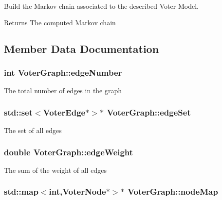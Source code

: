 Build the Markov chain associated to the described Voter Model. 

\begin{DoxyReturn}{Returns}
The computed Markov chain 
\end{DoxyReturn}


\subsection{Member Data Documentation}
\hypertarget{class_voter_graph_a6840594abf9c606b4ac8c7cac88cdf9b}{
\subsubsection[{edge\-Number}]{\setlength{\rightskip}{0pt plus 5cm}int Voter\-Graph\-::edge\-Number}}\label{class_voter_graph_a6840594abf9c606b4ac8c7cac88cdf9b}
The total number of edges in the graph \hypertarget{class_voter_graph_a712b0ec4b780579721b7b6bca8fd409e}{
\subsubsection[{edge\-Set}]{\setlength{\rightskip}{0pt plus 5cm}std\-::set$<${\bf Voter\-Edge}$\ast$$>$$\ast$ Voter\-Graph\-::edge\-Set}}\label{class_voter_graph_a712b0ec4b780579721b7b6bca8fd409e}
The set of all edges \hypertarget{class_voter_graph_a33dc5727bd80818f0d4e89c17303d7c8}{
\subsubsection[{edge\-Weight}]{\setlength{\rightskip}{0pt plus 5cm}double Voter\-Graph\-::edge\-Weight}}\label{class_voter_graph_a33dc5727bd80818f0d4e89c17303d7c8}
The sum of the weight of all edges \hypertarget{class_voter_graph_a73838569fae5c5c96efadb1f121f5a90}{
\subsubsection[{node\-Map}]{\setlength{\rightskip}{0pt plus 5cm}std\-::map$<$int,{\bf Voter\-Node}$\ast$$>$$\ast$ Voter\-Graph\-::node\-Map}}\label{class_voter_graph_a73838569fae5c5c96efadb1f121f5a90}
